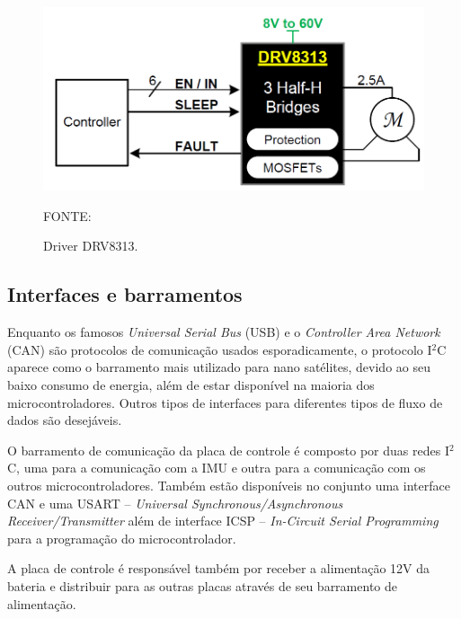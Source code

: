 \documentclass[
	12pt,				%
	openany,			%
	twoside,			%
	a4paper,			%
	english,			%
	french,				%
	spanish,			%
	brazil,				%
	oldfontcommands
	]{abntex2}
\begin{document}
\begin{figure}[th]
	\caption{Driver DRV8313.}
	\centering
	\includegraphics[width=0.6\linewidth]{./figs/DRV8313-fig}
	
	\begin{small}
		FONTE: \cite{DRV8313}
	\end{small}
	\label{fig:Driver}
\end{figure}


\subsection{Interfaces e barramentos}

Enquanto os famosos \textit{Universal Serial Bus} (USB) e o \textit{Controller Area Network} (CAN) são protocolos de comunicação usados esporadicamente, o protocolo I$^{2}$C aparece como o barramento mais utilizado para nano satélites, devido ao seu baixo consumo de energia, além de estar disponível na maioria dos microcontroladores. Outros tipos de interfaces para diferentes tipos de fluxo de dados são desejáveis. \cite{STATEOFART}

O barramento de comunicação da placa de controle é composto por duas redes I$^{2}$C, uma para a comunicação com a IMU e outra para a comunicação com os outros microcontroladores. Também estão disponíveis no conjunto uma interface CAN e uma USART – \textit{Universal Synchronous/Asynchronous Receiver/Transmitter} além de interface ICSP – \textit{In-Circuit Serial Programming} para a programação do microcontrolador.

	

A placa de controle é responsável também por receber a alimentação 12V da bateria e distribuir para as outras placas através de seu barramento de alimentação.
\end{document}
